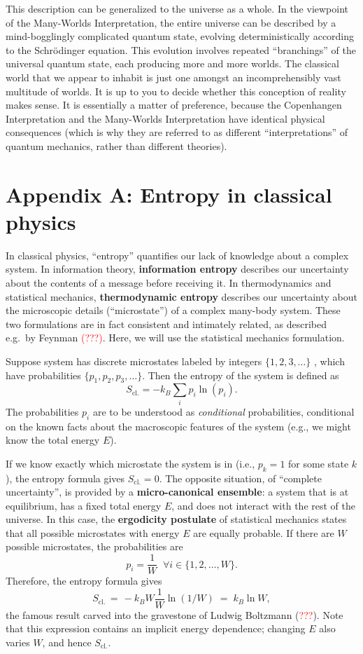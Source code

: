 \documentclass[pra,11pt]{revtex4}
\begin{document}
This description can be generalized to the universe as a whole.  In
the viewpoint of the Many-Worlds Interpretation, the entire universe
can be described by a mind-bogglingly complicated quantum state,
evolving deterministically according to the Schr\"odinger equation.
This evolution involves repeated ``branchings'' of the universal
quantum state, each producing more and more worlds.  The classical
world that we appear to inhabit is just one amongst an
incomprehensibly vast multitude of worlds.  It is up to you to decide
whether this conception of reality makes sense.  It is essentially a
matter of preference, because the Copenhangen Interpretation and the
Many-Worlds Interpretation have identical physical consequences (which
is why they are referred to as different ``interpretations'' of
quantum mechanics, rather than different theories).

\section*{Appendix A: Entropy in classical physics}
\label{appendixa}

In classical physics, ``entropy'' quantifies our lack of knowledge
about a complex system.  In information theory, \textbf{information
  entropy} describes our uncertainty about the contents of a message
before receiving it.  In thermodynamics and statistical mechanics,
\textbf{thermodynamic entropy} describes our uncertainty about the
microscopic details (``microstate'') of a complex many-body system.
These two formulations are in fact consistent and intimately related,
as described e.g.~by Feynman \textcolor{red}{(???)}.  Here, we will
use the statistical mechanics formulation.

Suppose system has discrete microstates labeled by integers
$\{1,2,3,\dots\}$ , which have probabilities $\{p_1, p_2, p_3,
\dots\}$.  Then the entropy of the system is defined as
$$S_{\mathrm{cl.}} = - k_B \sum_{i} p_i \ln(p_i).$$
The probabilities $p_i$ are to be understood as \textit{conditional}
probabilities, conditional on the known facts about the macroscopic
features of the system (e.g., we might know the total energy $E$).

If we know exactly which microstate the system is in (i.e., $p_k = 1$
for some state $k$), the entropy formula gives $S _{\mathrm{cl.}} =
0$.  The opposite situation, of ``complete uncertainty'', is provided
by a \textbf{micro-canonical ensemble}: a system that is at
equilibrium, has a fixed total energy $E$, and does not interact with
the rest of the universe.  In this case, the \textbf{ergodicity
  postulate} of statistical mechanics states that all possible
microstates with energy $E$ are equally probable.  If there are $W$
possible microstates, the probabilities are
$$p_i = \frac{1}{W} \;\;\forall i \in \{1,2,\dots,W\}.$$
Therefore, the entropy formula gives
$$S_{\mathrm{cl.}} \,=\, -k_B W \frac{1}{W} \ln(1/W) \;=\; k_B \ln W,$$
the famous result carved into the gravestone of Ludwig Boltzmann
(\textcolor{red}{???}).  Note that this expression contains an
implicit energy dependence; changing $E$ also varies $W$, and hence
$S_{\mathrm{cl.}}$.
\end{document}
